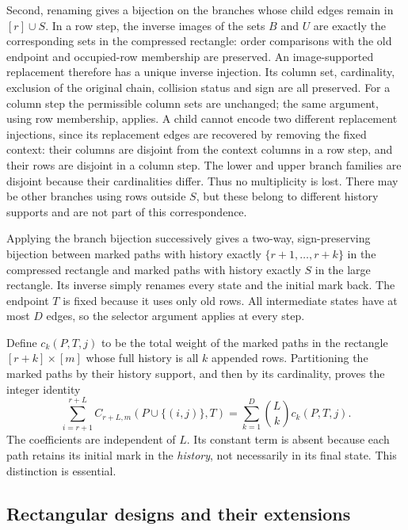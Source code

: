\documentclass[11pt,a4paper]{article}
\theoremstyle{definition}\newtheorem{definition}[theorem]{Definition}
\theoremstyle{remark}\newtheorem{remark}[theorem]{Remark}
\begin{document}
Second, renaming gives a bijection on the branches whose child edges
remain in $[r]\cup S$.  In a row step, the inverse images of the sets
$B$ and $U$ are exactly the corresponding sets in the compressed
rectangle: order comparisons with the old endpoint and occupied-row
membership are preserved.  An image-supported replacement therefore
has a unique inverse injection.  Its column set, cardinality, exclusion
of the original chain, collision status and sign are all preserved.
For a column step the permissible column sets are unchanged; the same
argument, using row membership, applies.  A child cannot encode two
different replacement injections, since its replacement edges are
recovered by removing the fixed context: their columns are disjoint
from the context columns in a row step, and their rows are disjoint
in a column step.  The lower and upper branch families are disjoint
because their cardinalities differ.  Thus no multiplicity is lost.
There may be other branches using rows outside $S$, but these belong to
different history supports and are not part of this correspondence.

Applying the branch bijection successively gives a two-way, sign-preserving
bijection between marked paths with history exactly
$\{r+1,\ldots,r+k\}$ in the compressed rectangle and marked paths with
history exactly $S$ in the large rectangle.  Its inverse simply renames
every state and the initial mark back.  The endpoint $T$ is fixed because
it uses only old rows.  All intermediate states have at most $D$ edges,
so the selector argument applies at every step.

Define $c_k(P,T,j)$ to be the total weight of the marked paths in the
rectangle $[r+k]\times[m]$ whose full history is all $k$ appended rows.
Partitioning the marked paths by their history support, and then by its
cardinality, proves the integer identity
\begin{equation}\label{eq:marked-coordinate}
 \sum_{i=r+1}^{r+L}
       C_{r+L,m}(P\cup\{(i,j)\},T)
    =\sum_{k=1}^{D}\binom{L}{k}c_k(P,T,j).
\end{equation}
The coefficients are independent of $L$.  Its constant term is absent
because each path retains its initial mark in the \emph{history}, not
necessarily in its final state.  This distinction is essential.

\subsection{Rectangular designs and their extensions}
\end{document}
